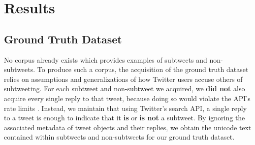 \documentclass[11pt, twoside, reqno]{book}
\begin{document}
\chapter{Results}
\label{results}

\section{Ground Truth Dataset}
\label{ground_truth_dataset}

No corpus already exists which provides examples of subtweets and non-subtweets. To produce such a corpus, the acquisition of the ground truth dataset relies on assumptions and generalizations of how Twitter users accuse others of subtweeting. For each subtweet and non-subtweet we acquired, we \textbf{did not} also acquire every single reply to that tweet, because doing so would violate the API's rate limits \cite{twitter_rate_limits}. Instead, we maintain that using Twitter's search API, a single reply to a tweet is enough to indicate that it \textbf{is} or \textbf{is not} a subtweet. By ignoring the associated metadata of tweet objects and their replies, we obtain the unicode text contained within subtweets and non-subtweets for our ground truth dataset.
\end{document}

